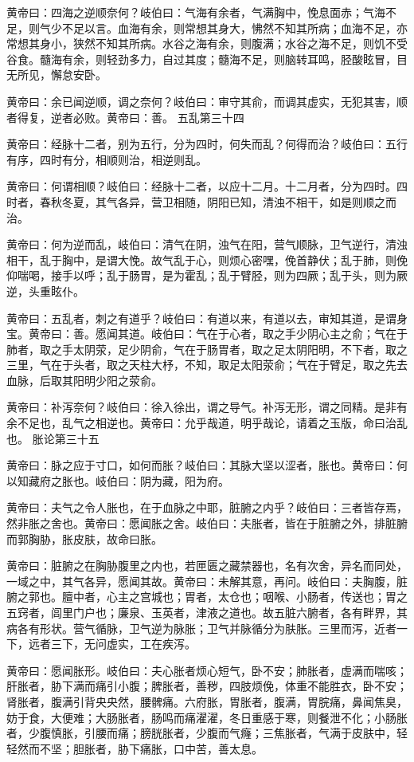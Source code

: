 \documentclass[a4paper,12pt,UTF8,twoside]{ctexbook}
\begin{document}
	黄帝曰：四海之逆顺奈何？岐伯曰：气海有余者，气满胸中，悗息面赤；气海不足，则气少不足以言。血海有余，则常想其身大，怫然不知其所病；血海不足，亦常想其身小，狭然不知其所病。水谷之海有余，则腹满；水谷之海不足，则饥不受谷食。髓海有余，则轻劲多力，自过其度；髓海不足，则脑转耳鸣，胫酸眩冒，目无所见，懈怠安卧。
	
	黄帝曰：余已闻逆顺，调之奈何？岐伯曰：审守其俞，而调其虚实，无犯其害，顺者得复，逆者必败。黄帝曰：善。
	五乱第三十四
	
	黄帝曰：经脉十二者，别为五行，分为四时，何失而乱？何得而治？岐伯曰：五行有序，四时有分，相顺则治，相逆则乱。
	
	黄帝曰：何谓相顺？岐伯曰：经脉十二者，以应十二月。十二月者，分为四时。四时者，春秋冬夏，其气各异，营卫相随，阴阳已知，清浊不相干，如是则顺之而治。
	
	黄帝曰：何为逆而乱，岐伯曰：清气在阴，浊气在阳，营气顺脉，卫气逆行，清浊相干，乱于胸中，是谓大悗。故气乱于心，则烦心密嘿，俛首静伏；乱于肺，则俛仰喘喝，接手以呼；乱于肠胃，是为霍乱；乱于臂胫，则为四厥；乱于头，则为厥逆，头重眩仆。
	
	黄帝曰：五乱者，刺之有道乎？岐伯曰：有道以来，有道以去，审知其道，是谓身宝。黄帝曰：善。愿闻其道。岐伯曰：气在于心者，取之手少阴心主之俞；气在于肺者，取之手太阴荥，足少阴俞，气在于肠胃者，取之足太阴阳明，不下者，取之三里，气在于头者，取之天柱大杼，不知，取足太阳荥俞；气在于臂足，取之先去血脉，后取其阳明少阳之荥俞。
	
	黄帝曰：补泻奈何？岐伯曰：徐入徐出，谓之导气。补泻无形，谓之同精。是非有余不足也，乱气之相逆也。黄帝曰：允乎哉道，明乎哉论，请着之玉版，命曰治乱也。
	胀论第三十五
	
	黄帝曰：脉之应于寸口，如何而胀？岐伯曰：其脉大坚以涩者，胀也。黄帝曰：何以知藏府之胀也。岐伯曰：阴为藏，阳为府。
	
	黄帝曰：夫气之令人胀也，在于血脉之中耶，脏腑之内乎？岐伯曰：三者皆存焉，然非胀之舍也。黄帝曰：愿闻胀之舍。岐伯曰：夫胀者，皆在于脏腑之外，排脏腑而郭胸胁，胀皮肤，故命曰胀。
	
	黄帝曰：脏腑之在胸胁腹里之内也，若匣匮之藏禁器也，名有次舍，异名而同处，一域之中，其气各异，愿闻其故。黄帝曰：未解其意，再问。岐伯曰：夫胸腹，脏腑之郭也。膻中者，心主之宫城也；胃者，太仓也；咽喉、小肠者，传送也；胃之五窍者，闾里门户也；廉泉、玉英者，津液之道也。故五脏六腑者，各有畔界，其病各有形状。营气循脉，卫气逆为脉胀；卫气并脉循分为肤胀。三里而泻，近者一下，远者三下，无问虚实，工在疾泻。
	
	黄帝曰：愿闻胀形。岐伯曰：夫心胀者烦心短气，卧不安；肺胀者，虚满而喘咳；肝胀者，胁下满而痛引小腹；脾胀者，善秽，四肢烦俛，体重不能胜衣，卧不安；肾胀者，腹满引背央央然，腰髀痛。六府胀，胃胀者，腹满，胃脘痛，鼻闻焦臭，妨于食，大便难；大肠胀者，肠鸣而痛濯濯，冬日重感于寒，则餐泄不化；小肠胀者，少腹慎胀，引腰而痛；膀胱胀者，少腹而气癃；三焦胀者，气满于皮肤中，轻轻然而不坚；胆胀者，胁下痛胀，口中苦，善太息。
	
\end{document}
